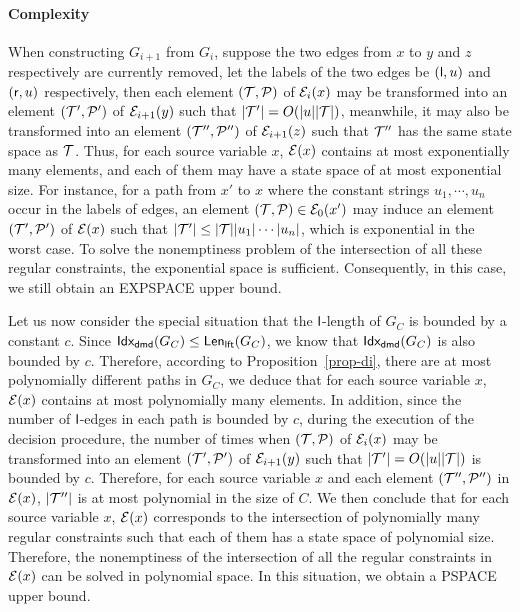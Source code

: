 \paragraph*{Complexity}
When constructing $G_{i+1}$ from $G_i$, suppose the two edges from $x$ to $y$ and $z$ respectively are currently removed, let the labels of the two edges be $({\sf l}, u)$ and $({\sf r}, u)$ respectively, then each element $(\mathcal{T}, \mathcal{P})$ of $\mathcal{E}_i(x)$ may be transformed into an element $(\mathcal{T}', \mathcal{P}')$ of $\mathcal{E}_{i+1}(y)$ such that $|\mathcal{T}'| = O(|u||\mathcal{T}|)$, meanwhile, it may also be transformed into an element $(\mathcal{T}'', \mathcal{P}'')$ of $\mathcal{E}_{i+1}(z)$ such that $\mathcal{T}''$ has the same state space as $\mathcal{T}$.
Thus, for each source variable $x$, $\mathcal{E}(x)$ contains at most exponentially many elements, and each of them may have a state space of at most exponential size. For instance, for a path from $x'$ to $x$ where the constant strings $u_1,\cdots, u_n$ occur in the labels of edges, an element $(\mathcal{T},\mathcal{P}) \in \mathcal{E}_0(x')$ may induce an element $(\mathcal{T}', \mathcal{P}')$ of $\mathcal{E}(x)$ such that $|\mathcal{T}'| \le |\mathcal{T}| |u_1| \cdots |u_n|$, which is exponential in the worst case. 
%
To solve the nonemptiness problem of the intersection of all these regular constraints, the exponential space is sufficient. Consequently, in this case, we still obtain an EXPSPACE upper bound. 

Let us now consider the special situation that the $\mathsf{l}$-length of $G_C$ is bounded by a constant $c$.
Since ${\sf Idx_{dmd}}(G_C) \le {\sf Len_{lft}}(G_C)$, we know that ${\sf Idx_{dmd}}(G_C)$ is also bounded by $c$. Therefore, according to Proposition~\ref{prop-di}, there are at most polynomially different paths in $G_C$, we deduce that for each source variable $x$, $\mathcal{E}(x)$ contains at most polynomially many elements. In addition, since the number of $\mathsf{l}$-edges in each path is bounded by $c$, during the execution of the decision procedure, the number of times when $(\mathcal{T}, \mathcal{P})$ of $\mathcal{E}_i(x)$ may be transformed into an element $(\mathcal{T}', \mathcal{P}')$ of $\mathcal{E}_{i+1}(y)$ such that $|\mathcal{T}'| = O(|u||\mathcal{T}|)$ is bounded by $c$.
Therefore, for each source variable $x$ and each element $(\mathcal{T}'', \mathcal{P}'')$ in $\mathcal{E}(x)$,  $|\mathcal{T}''|$ is at most polynomial in the size of $C$. We then conclude that for each source variable $x$, $\mathcal{E}(x)$ corresponds to the intersection of polynomially many regular constraints such that each of them has a state space of polynomial size. Therefore, the nonemptiness of the intersection of all the regular constraints in $\mathcal{E}(x)$ can be solved in polynomial space. In this situation, we obtain a PSPACE upper bound.

